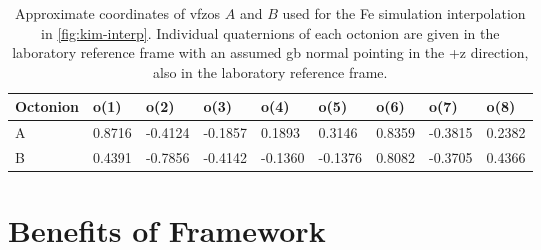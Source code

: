\documentclass[final,twocolumn,12pt]{elsarticle}
\begin{document}
\begin{table}
\centering
\caption{Approximate coordinates of \glspl{vfzo} $A$ and $B$ used for the Fe simulation interpolation in \cref{fig:kim-interp}. Individual quaternions of each octonion are given in the laboratory reference frame with an assumed \gls{gb} normal pointing in the +z direction, also in the laboratory reference frame.}
\label{tab:tunnel-AB2}
\begin{tabular}{lllllllll}
\hline
Octonion & o(1)   & o(2)    & o(3)    & o(4)    & o(5)    & o(6)   & o(7)    & o(8)   \\ \hline
A        & 0.8716 & -0.4124 & -0.1857 & 0.1893  & 0.3146  & 0.8359 & -0.3815 & 0.2382 \\
B        & 0.4391 & -0.7856 & -0.4142 & -0.1360 & -0.1376 & 0.8082 & -0.3705 & 0.4366 \\ \hline
\end{tabular}
\end{table}

\section{Benefits of  Framework}
\end{document}
